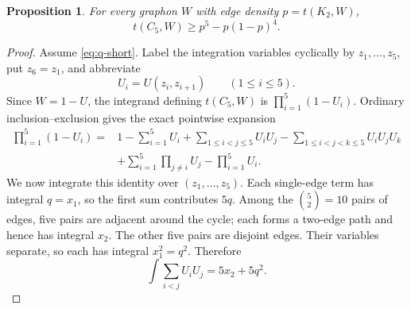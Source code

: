 \documentclass[11pt]{article}
\newtheorem{proposition}[theorem]{Proposition}
\numberwithin{equation}{section}
\begin{document}
\begin{proposition}\label{prop:C5}
  For every graphon $W$ with edge density $p=t(K_2,W)$,
  \[
    t(C_5,W)\ge p^5-p(1-p)^4.
  \]
\end{proposition}

\begin{proof}
  Assume \eqref{eq:q-short}.  Label the integration variables cyclically by
  $z_1,\ldots,z_5$, put $z_6=z_1$, and abbreviate
  \[
    U_i=U(z_i,z_{i+1})\qquad(1\le i\le5).
  \]
  Since $W=1-U$, the integrand defining $t(C_5,W)$ is
  $\prod_{i=1}^5(1-U_i)$.  Ordinary inclusion--exclusion gives the exact
  pointwise expansion
  \begin{align*}
    \prod_{i=1}^5(1-U_i)
    ={}&1-\sum_{i=1}^5U_i
    +\sum_{1\le i<j\le5}U_iU_j
    -\sum_{1\le i<j<k\le5}U_iU_jU_k\\
    &+\sum_{i=1}^5\prod_{j\ne i}U_j
    -\prod_{i=1}^5U_i.
  \end{align*}
  We now integrate this identity over $(z_1,\ldots,z_5)$.  Each single-edge
  term has integral $q=x_1$, so the first sum contributes $5q$.  Among the
  $\binom52=10$ pairs of edges, five pairs are adjacent around the cycle;
  each forms a two-edge path and hence has integral $x_2$.  The other five
  pairs are disjoint edges.  Their variables separate, so each has integral
  $x_1^2=q^2$.  Therefore
  \[
    \int\sum_{i<j}U_iU_j=5x_2+5q^2.
  \]


\end{proof}
\end{document}

